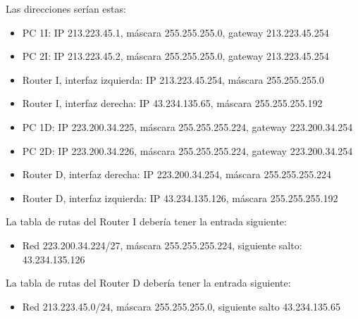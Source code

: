 \documentclass[letterpaper,10pt,spanish]{sphinxmanual}
\begin{document}
\sphinxAtStartPar
Las direcciones serían estas:
\begin{itemize}
\item {} 
\sphinxAtStartPar
PC 1I: IP 213.223.45.1, máscara 255.255.255.0, gateway 213.223.45.254

\item {} 
\sphinxAtStartPar
PC 2I: IP 213.223.45.2, máscara 255.255.255.0, gateway 213.223.45.254

\item {} 
\sphinxAtStartPar
Router I, interfaz izquierda: IP 213.223.45.254, máscara 255.255.255.0

\item {} 
\sphinxAtStartPar
Router I, interfaz derecha: IP 43.234.135.65, máscara 255.255.255.192

\item {} 
\sphinxAtStartPar
PC 1D: IP 223.200.34.225, máscara 255.255.255.224, gateway 223.200.34.254

\item {} 
\sphinxAtStartPar
PC 2D: IP 223.200.34.226, máscara 255.255.255.224, gateway 223.200.34.254

\item {} 
\sphinxAtStartPar
Router D, interfaz derecha: IP 223.200.34.254, máscara 255.255.255.224

\item {} 
\sphinxAtStartPar
Router D, interfaz izquierda: IP 43.234.135.126, máscara 255.255.255.192

\end{itemize}

\sphinxAtStartPar
La tabla de rutas del Router I debería tener la entrada siguiente:
\begin{itemize}
\item {} 
\sphinxAtStartPar
Red 223.200.34.224/27, máscara 255.255.255.224, siguiente salto: 43.234.135.126

\end{itemize}

\sphinxAtStartPar
La tabla de rutas del Router D debería tener la entrada siguiente:
\begin{itemize}
\item {} 
\sphinxAtStartPar
Red 213.223.45.0/24, máscara 255.255.255.0, siguiente salto 43.234.135.65

\end{itemize}
\end{document}
